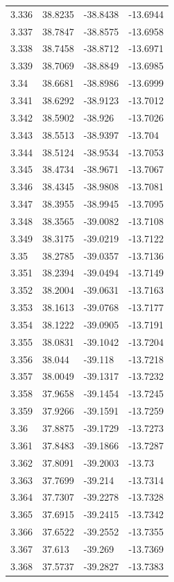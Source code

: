 \begin{tabular}{llll}
3.336 & 38.8235 & -38.8438 & -13.6944 \\
3.337 & 38.7847 & -38.8575 & -13.6958 \\
3.338 & 38.7458 & -38.8712 & -13.6971 \\
3.339 & 38.7069 & -38.8849 & -13.6985 \\
3.34 & 38.6681 & -38.8986 & -13.6999 \\
3.341 & 38.6292 & -38.9123 & -13.7012 \\
3.342 & 38.5902 & -38.926 & -13.7026 \\
3.343 & 38.5513 & -38.9397 & -13.704 \\
3.344 & 38.5124 & -38.9534 & -13.7053 \\
3.345 & 38.4734 & -38.9671 & -13.7067 \\
3.346 & 38.4345 & -38.9808 & -13.7081 \\
3.347 & 38.3955 & -38.9945 & -13.7095 \\
3.348 & 38.3565 & -39.0082 & -13.7108 \\
3.349 & 38.3175 & -39.0219 & -13.7122 \\
3.35 & 38.2785 & -39.0357 & -13.7136 \\
3.351 & 38.2394 & -39.0494 & -13.7149 \\
3.352 & 38.2004 & -39.0631 & -13.7163 \\
3.353 & 38.1613 & -39.0768 & -13.7177 \\
3.354 & 38.1222 & -39.0905 & -13.7191 \\
3.355 & 38.0831 & -39.1042 & -13.7204 \\
3.356 & 38.044 & -39.118 & -13.7218 \\
3.357 & 38.0049 & -39.1317 & -13.7232 \\
3.358 & 37.9658 & -39.1454 & -13.7245 \\
3.359 & 37.9266 & -39.1591 & -13.7259 \\
3.36 & 37.8875 & -39.1729 & -13.7273 \\
3.361 & 37.8483 & -39.1866 & -13.7287 \\
3.362 & 37.8091 & -39.2003 & -13.73 \\
3.363 & 37.7699 & -39.214 & -13.7314 \\
3.364 & 37.7307 & -39.2278 & -13.7328 \\
3.365 & 37.6915 & -39.2415 & -13.7342 \\
3.366 & 37.6522 & -39.2552 & -13.7355 \\
3.367 & 37.613 & -39.269 & -13.7369 \\
3.368 & 37.5737 & -39.2827 & -13.7383 \\

\end{tabular}
